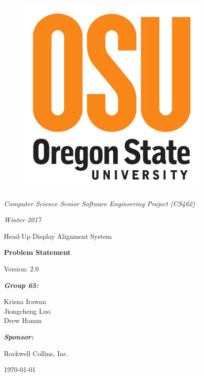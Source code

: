 \documentclass[letterpaper,10pt,onecolumn]{IEEEtran}
\def\title{Computer Science Senior Software Engineering Project (CS462)}
\def\name{Krisna Irawan\\ Jiongcheng Luo\\ Drew Hamm}
\def\doc{Problem Statement}
\def\version{2.0}
\def\term{Winter 2017}
\def\project{Head-Up Display Alignment System}
\begin{document}
\begin{titlepage}
\centering
	\begin{figure}[!ht]
	    \includegraphics[scale=0.25]{osu_logo}
	\end{figure}
	{\Large\itshape \title\par}
	{\Large\itshape \term\par}
	\vspace{1cm}
	\scshape{
		{\Huge \project\par}
		\vspace{1cm}
		{\Huge\bfseries\doc\par}
		{\large Version: \version\par}
	}
	\vspace{1cm}
	{\large\itshape\bfseries Group 65:\par}
	{\large \name\par}
	\vspace{1cm}
	{\large\itshape\bfseries Sponsor:\par}
	{\large Rockwell Collins, Inc.\par}
	\vspace{1cm}
	{\large \today\par}
	\vspace{3cm}


\end{titlepage}
\end{document}
